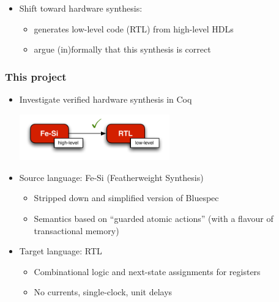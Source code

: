 \documentclass[9pt]{beamer}
\newcommand\fesi{Fe-Si}
\begin{document}
\begin{frame}
\begin{itemize}
    \pause
    
  \item Shift toward \alert{hardware synthesis}: 
    \begin{itemize}
    \item generates low-level code (RTL) from high-level HDLs
    \item argue (in)formally that this synthesis is correct
    \end{itemize}
  \end{itemize}
\end{frame}

\begin{frame}
  \frametitle{This project}
  \begin{itemize}
  \item  Investigate verified hardware synthesis in Coq
    
    \begin{center}
      \includegraphics[height= 2cm ]{figs/compilation.pdf}
    \end{center}
    \pause
    
  \item Source language: \alert{\fesi{}} (Featherweight Synthesis)
    \begin{itemize}
    \item Stripped down and simplified version of \alert{Bluespec} 
    \item Semantics based on ``guarded atomic actions'' (with a flavour of transactional memory)
    \end{itemize}
   
    \pause
    
  \item Target language: RTL
    \begin{itemize}
    \item Combinational logic and next-state assignments for registers
    \item No currents, single-clock, unit delays
    \end{itemize}
  \end{itemize}
\end{frame}
\end{document}
